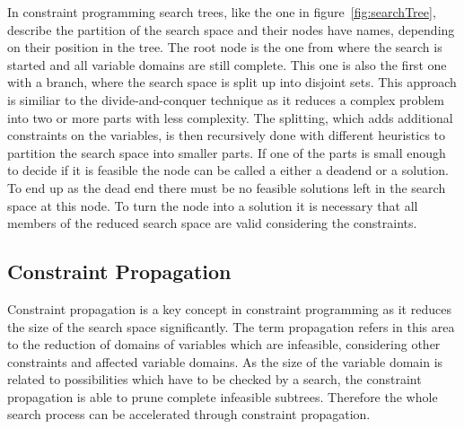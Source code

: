 \documentclass[10pt,
               a4paper,
               journal,
               ]{IEEEtran}
\newcommand{\reffig}[1]{{figure~\ref{#1}}}
\begin{document}
	In constraint programming search trees, like the one in \reffig{fig:searchTree}, describe the partition of the search space and their nodes have names, depending on their position in the tree. The root node is the one from where the search is started and all variable domains are still complete. This one is also the first one with a branch, where the search space is split up into disjoint sets. This approach is similiar to the divide-and-conquer technique as it reduces a complex problem into two or more parts with less complexity. The splitting, which adds additional constraints on the variables, is then recursively done with different heuristics to partition the search space into smaller parts. If one of the parts is small enough to decide if it is feasible the node can be called a either a deadend or a solution. To end up as the dead end there must be no feasible solutions left in the search space at this node. To turn the node into a solution it is necessary that all members of the reduced search space are valid considering the constraints.
	
	\subsection{Constraint Propagation}
	Constraint propagation is a key concept in constraint programming as it reduces the size of the search space significantly. The term propagation refers in this area to the reduction of domains of variables which are infeasible, considering other constraints and affected variable domains. As the size of the variable domain is related to possibilities which have to be checked by a search, the constraint propagation is able to prune complete infeasible subtrees. Therefore the whole search process can be accelerated through constraint propagation.
	
\end{document}
